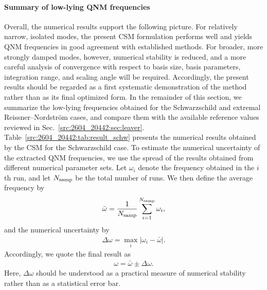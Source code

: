 \paragraph{Summary of low-lying QNM frequencies}
Overall, the numerical results support the following picture.
For relatively narrow, isolated modes, the present CSM formulation performs well and yields QNM frequencies in good agreement with established methods.
For broader, more strongly damped modes, however, numerical stability is reduced, and a more careful analysis of convergence with respect to basis size, basis parameters, integration range, and scaling angle will be required.
Accordingly, the present results should be regarded as a first systematic demonstration of the method rather than as its final optimized form.
In the remainder of this section, we summarize the low-lying frequencies obtained for the Schwarzschild and extremal Reissner--Nordstr\"om cases, and compare them with the available reference values reviewed in Sec.~\ref{src:2604_20442:sec:leaver}.
Table~\ref{src:2604_20442:tab:result_schw} presents the numerical results obtained by the CSM for the Schwarzschild case.
To estimate the numerical uncertainty of the extracted QNM frequencies, we use the spread of the results obtained from different numerical parameter sets.
Let $\omega_i$ denote the frequency obtained in the $i$th run, and let $N_{\mathrm{samp}}$ be the total number of runs.
We then define the average frequency by
\begin{align}
    \bar{\omega}
    =
    \frac{1}{N_{\mathrm{samp}}}
    \sum_{i=1}^{N_{\mathrm{samp}}}
    \omega_i ,
\end{align}
and the numerical uncertainty by
\begin{align}
    \Delta \omega
    =
    \max_i
    \left|
        \omega_i-\bar{\omega}
    \right|.
\end{align}
Accordingly, we quote the final result as
\begin{align}
    \omega = \bar{\omega} \pm \Delta\omega .
\end{align}
Here, $\Delta\omega$ should be understood as a practical measure of numerical stability rather than as a statistical error bar.
